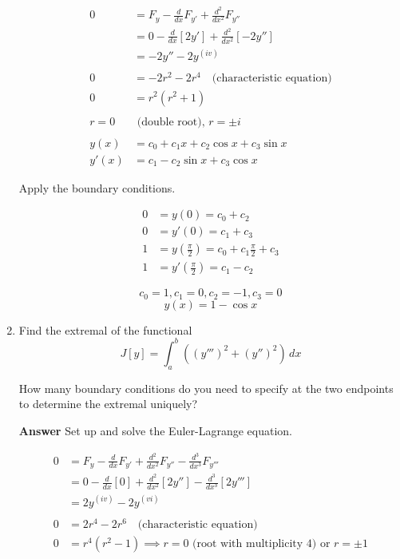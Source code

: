 \documentclass[12pt]{article}
\begin{document}
\begin{enumerate}
\begin{align*}
0 &= F_y - \frac{d}{dx}F_{y'} + \frac{d^2}{dx^2}F_{y''} \\
&= 0 -\frac{d}{dx}[2y'] + \frac{d^2}{dx^2}[-2y'']\\
&= -2y'' - 2y^{(iv)} \\
& \\
0 &= -2r^2 - 2r^4 \quad \text{(characteristic equation)} \\
0 &= r^2(r^2+1) \\
&\\
r = 0 & \text{ (double root), } r = \pm i \\
&\\
y(x) &= c_0 + c_1x + c_2\cos x + c_3 \sin x \\
y'(x) &= c_1 - c_2 \sin x + c_3 \cos x
\end{align*}

Apply the boundary conditions.

\begin{align*}
0 &= y(0) = c_0 + c_2 \\
0 &= y'(0) = c_1 + c_3 \\
1 &= y\left(\frac{\pi}{2}\right) = c_0 + c_1\frac{\pi}{2} + c_3\\
1 &= y'\left(\frac{\pi}{2}\right) = c_1-c_2
\end{align*}

$$c_0 = 1, c_1 = 0, c_2 = -1, c_3 = 0 $$
$$\boxed{y(x) = 1 - \cos x} $$

\newpage
\item Find the extremal of the functional
$$
J[y] = \int_a ^b \left((y''')^2  + (y'')^2  \right)\,dx
$$

How many boundary conditions do you need to specify at the two endpoints to determine the extremal uniquely?

{\bf Answer} Set up and solve the Euler-Lagrange equation.

\begin{align*}
0 &= F_y - \frac{d}{dx}F_{y'} + \frac{d^2}{dx^2}F_{y''} - \frac{d^3}{dx^3}F_{y'''} \\
&= 0 - \frac{d}{dx}[0] + \frac{d^2}{dx^2}[2y''] - \frac{d^3}{dx^3}[2y'''] \\
&= 2y^{(iv)} - 2y^{(vi)} \\
& \\
0 &= 2r^4 - 2r^6 \quad \text{(characteristic equation)} \\
0 &= r^4(r^2-1) \implies r = 0 \text{ (root with multiplicity 4) or } r= \pm 1 
\end{align*}


\end{enumerate}
\end{document}
